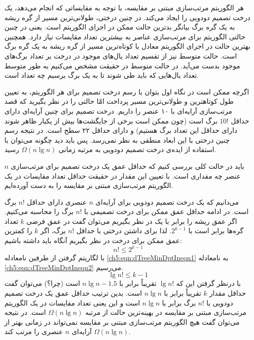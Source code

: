 هر الگوریتم مرتب‌سازی مبتنی بر مقایسه، با توجه به مقایساتی که انجام می‌دهد، یک درخت تصمیم دودویی را ایجاد می‌کند. در چنین درختی، طولانی‌ترین مسیر از گره ریشه به یک گره برگ بیانگر بدترین حالت ممکن در اجرای الگوریتم است. یعنی در چنین حالتی الگوریتم برای مرتب‌سازی عناصر به بیشترین تعداد مقایسات نیاز دارد. همچنین بهترین حالت در اجرای الگوریتم معادل با کوتاه‌ترین مسیر از گره ریشه به یک گره برگ است. حالت متوسط نیز از تقسیم تعداد یال‌های موجود در درخت بر تعداد برگ‌های موجود بدست می‌آید. در حالت متوسط در حقیقت مشخص می‌کنیم  به طور متوسط تعداد یال‌هایی که باید طی شوند تا به یک برگ برسیم چه تعداد است.

اگرچه ممکن است در نگاه اول بتوان با رسم درخت تصمیم برای هر الگوریتم، به تعیین طول کوتاهترین و طولانی‌ترین مسیر پرداخت امّا حالتی را در نظر بگیرید که قصد مرتب‌سازی آرایه‌ای با ۱۰ عنصر را داریم. درخت تصمیم برای چنین آرایه‌ای دارای حداقل {$10!$} برگ است (چون ممکن است برخی از جایگشت‌ها بیش از یکبار ظاهر شوند دارای حداقل این تعداد برگ هستیم) و دارای حداقل ۲۲ سطح است. در نتیجه رسم چنین درختی با این ابعاد منطقی به نظر نمی‌رسد. پس باید دید چگونه می‌توان با استفاده از ایده‌ی درخت تصمیم دودویی به مرتبه زمانی {$\Omega (n\lg n)$} رسید.

باید در حالت کلی بررسی کنیم که حداقل عمق یک درخت تصمیم برای مرتب‌سازی {$n$} عنصر چه مقداری است. با تعیین این مقدار در حقیقت حداقل تعداد مقایسات در یک الگوریتم مرتب‌سازی مبتنی بر مقایسه را به دست آورده‌ایم.

می‌دانیم که یک درخت تصمیم دودویی برای آرایه‌ای {$n$} عنصری دارای حداقل {$n!$} برگ است. در ادامه حداقل عمق ممکن برای درخت تصمیمی با {$n!$} برگ را محاسبه می‌کنیم. اگر عمق ریشه را برابر با یک در نظر بگیریم می‌توان گفت در عمق فرضی {$k$} تعداد گره‌ها برابر است با {$2^{k-1}$}. لذا برای داشتن درختی با حداقل {$n!$} برگ، اگر {$k$} را کمترین عمق ممکن برای درخت در نظر بگیریم آنگاه باید داشته باشیم:
\begin{equation}
n!\leq 2^{k-1}\label{ch5:eqn:dTreeMinDptIneqn1}
\end{equation}
 با لگاریتم گرفتن از طرفین نامعادله {\eqref{ch5:eqn:dTreeMinDptIneqn1}} به نامعادله {\eqref{ch5:eqn:dTreeMinDptIneqn2}} می‌رسیم.
\begin{equation}
\lg n! \leq k-1\label{ch5:eqn:dTreeMinDptIneqn2}
\end{equation}
با درنظر گرفتن این که {$\lg n!$} تقریباً برابر با {$n\lg n -1.5$} است (چرا؟) می‌توان گفت حداقل مقدار {$k$} تقریباً برابر با {$n\lg n$} است. بدین ترتیب حداقل عمق یک درخت تصمیم دودویی با {$n!$} برگ برابر با {$n\lg n$} است و این یعنی تعداد مقایسات در یک الگوریتم مرتب‌سازی مبتنی بر مقایسه در بهینه‌ترین حالت از مرتبه {$\Omega (n\lg n)$} است. در نتیجه می‌توان گفت هیچ الگوریتم مرتب‌سازی مبتنی بر مقایسه نمی‌تواند در زمانی بهتر از {$\Omega (n\lg n)$} آرایه‌ای {$n$} عنصری را مرتب کند.